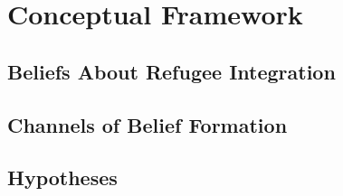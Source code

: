 \section{Conceptual Framework}

\subsection{Beliefs About Refugee Integration}

\subsection{Channels of Belief Formation}

\subsection{Hypotheses}